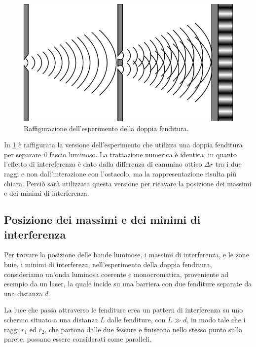 \documentclass[12pt,a4paper]{report}
\begin{document}
\begin{figure}[!ht]
    \centering
    \includegraphics[width=\linewidth]{Immagini/double_slit_above.png}
    \captionsetup{width=.8\linewidth}
    \caption{Raffigurazione dell'esperimento della doppia fenditura.}
    \label{fig:doubleSlitAbove}
\end{figure}

In \cref{fig:doubleSlitAbove} è raffigurata la versione dell'esperimento che utilizza una doppia fenditura per separare il fascio luminoso. La trattazione numerica è identica, in quanto l'effetto di intereferenza è dato dalla differenza di cammino ottico \( \Delta r \) tra i due raggi e non dall'interazione con l'ostacolo, ma la rappresentazione risulta più chiara. Perciò sarà utilizzata questa versione per ricavare la posizione dei massimi e dei minimi di interferenza.

\subsection{Posizione dei massimi e dei minimi di interferenza}

Per trovare la posizione delle bande luminose, i massimi di interferenza, e le zone buie, i minimi di interfereza, nell'esperimento della doppia fenditura, consideriamo un'onda luminosa coerente e monocromatica, proveniente ad esempio da un laser, la quale incide su una barriera con due fenditure separate da una distanza \(d\). 

La luce che passa attraverso le fenditure crea un pattern di interferenza su uno schermo situato a una distanza \(L\) dalle fenditure, con \(L \gg d \), in modo tale che i raggi \(r_1\) ed \(r_2\), che partono dalle due fessure e finiscono nello stesso punto sulla parete, possano essere considerati come paralleli.
\end{document}
